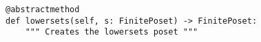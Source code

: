 \begin{verbatim}
@abstractmethod
def lowersets(self, s: FinitePoset) -> FinitePoset:
    """ Creates the lowersets poset """
\end{verbatim}